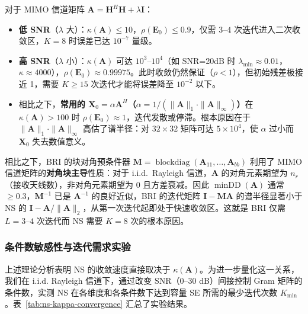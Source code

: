 \documentclass{CjC}
\begin{document}
    对于 MIMO 信道矩阵 $\bm{A}= \bm{H}^{H}\bm{H}+ \lambda\bm{I}$：
    \begin{itemize}
        \item \textbf{低 SNR}（$\lambda$ 大）：$\kappa(\bm{A}) \leqslant 10$，$\rho
            (\bm{E}_{0}) \leqslant 0.9$，仅需 $3$--$4$ 次迭代进入二次收敛区，$K=8$
            时误差已达 $10^{-7}$ 量级。

        \item \textbf{高 SNR}（$\lambda$ 小）：$\kappa(\bm{A})$ 可达 $10^{3}$--$1
            0^{4}$（如 SNR=20dB 时 $\lambda_{\min}\approx 0.01$，$\kappa\approx 4
            000$），$\rho(\bm{E}_{0}) \approx 0.99975$。此时收敛仍然保证（$\rho<1$），但初始残差极接近
            1，需要 $K\geqslant 15$ 次迭代才能将误差降至 $10^{-2}$ 以下。

        \item 相比之下，\textbf{常用的 $\bm{X}_{0}=\alpha\bm{A}^{H}$（$\alpha=1/(
            \|\bm{A}\|_{1}\cdot\|\bm{A}\|_{\infty})$）}在 $\kappa(\bm{A})>100$
            时 $\rho(\bm{E}_{0})\approx 1$，迭代发散或停滞。根本原因在于 $\|\bm{A}
            \|_{1}\cdot\|\bm{A}\|_{\infty}$ 高估了谱半径：对 $32\times32$ 矩阵可达
            $5\times10^{4}$，使 $\alpha$ 过小而 $\bm{X}_{0}$ 失去数值意义。
    \end{itemize}

    相比之下，BRI 的块对角预条件器
    $\bm{M}= \operatorname{blockdiag}(\bm{A}_{11}, \dots, \bm{A}_{bb})$ 利用了
    MIMO 信道矩阵的\textbf{对角块主导}性质：对于 i.i.d.\ Rayleigh 信道，$\bm{A}$
    的对角元素期望为 $n_{r}$（接收天线数），非对角元素期望为 0 且方差衰减。因此
    $\operatorname{minDD}(\bm{A})$ 通常 $\geq 0.3$，$\bm{M}^{-1}$ 已是
    $\bm{A}^{-1}$ 的良好近似，BRI 的迭代矩阵 $\bm{I}- \bm{M}\bm{A}$
    的谱半径显著小于 NS 的 $\bm{I}- \bm{A}/\|\bm{A}\|_{2}$，从第一次迭代起即处于快速收敛区。这就是
    BRI 仅需 $L=3$--$4$ 次迭代而 NS 需要 $K=8$ 次的根本原因。

\subsubsection{条件数敏感性与迭代需求实验}

上述理论分析表明 NS 的收敛速度直接取决于 $\kappa(\bm{A})$。为进一步量化这一关系，我们在 i.i.d. Rayleigh 信道下，通过改变 SNR（0--30 dB）间接控制 Gram 矩阵的条件数，实测 NS 在各维度和各条件数下达到容量 SE 所需的最少迭代次数 $K_{\min}$。表~\ref{tab:ns-kappa-convergence} 汇总了实验结果。
\end{document}
